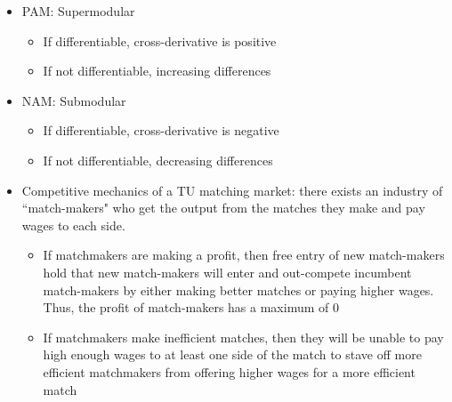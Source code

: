 \documentclass{article}
\begin{document}
\begin{itemize}
	\item PAM: Supermodular
		\begin{itemize}
			\item If differentiable, cross-derivative is positive
			\item If not differentiable, increasing differences 
		\end{itemize}
	\item NAM: Submodular
		\begin{itemize}
			\item If differentiable, cross-derivative is negative
			\item If not differentiable, decreasing differences 
		\end{itemize}
	
	\item Competitive mechanics of a TU matching market: there exists an industry of ``match-makers" who get the output from the matches they make and pay wages to each side.
		\begin{itemize}
			\item If matchmakers are making a profit, then free entry of new match-makers hold that new match-makers will enter and out-compete incumbent match-makers by either making better matches or paying higher wages. Thus, the profit of match-makers has a maximum of 0
			
			\item If matchmakers make inefficient matches, then they will be unable to pay high enough wages to at least one side of the match to stave off more efficient matchmakers from offering higher wages for a more efficient match
		\end{itemize}
	

\end{itemize}
\end{document}

